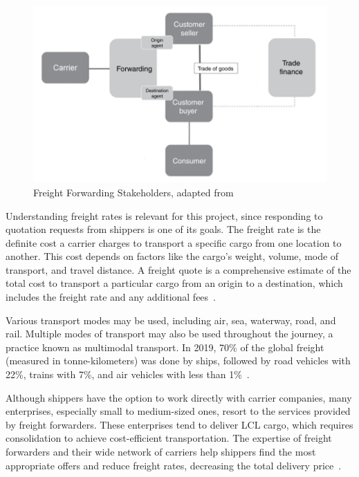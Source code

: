 \documentclass[12pt, reqno]{amsbook}
\theoremstyle{definition}
\theoremstyle{definition}
\numberwithin{section}{chapter}
\numberwithin{table}{chapter}
\numberwithin{figure}{chapter}
\begin{document}
\begin{figure}[H]
  \centering
  \includegraphics[width=0.9\linewidth]{images/FreightForwarding.png}
  \caption{\label{Figure:FreightForwarding}Freight Forwarding Stakeholders, adapted from~\cite{Peffers2007}}
\end{figure}

Understanding freight rates is relevant for this project, since responding to quotation requests from shippers is one of its goals. The freight rate is the definite cost a carrier charges to transport a specific cargo from one location to another. This cost depends on factors like the cargo's weight, volume, mode of transport, and travel distance. A freight quote is a comprehensive estimate of the total cost to transport a particular cargo from an origin to a destination, which includes the freight rate and any additional fees~\cite{Song2021, Mairon_Freight, Wang2021, WebCargo}.

Various transport modes may be used, including air, sea, waterway, road, and rail. Multiple modes of transport may also be used throughout the journey, a practice known as multimodal transport. In 2019, 70\% of the global freight (measured in tonne-kilometers) was done by ships, followed by road vehicles with 22\%, trains with 7\%, and air vehicles with less than 1\%~\cite{ITF2023}.

Although shippers have the option to work directly with carrier companies, many enterprises, especially small to medium-sized ones, resort to the services provided by freight forwarders. These enterprises tend to deliver \ac{LCL} cargo, which requires consolidation to achieve cost-efficient transportation. The expertise of freight forwarders and their wide network of carriers help shippers find the most appropriate offers and reduce freight rates, decreasing the total delivery price~\cite{Huang2019}.
\end{document}
